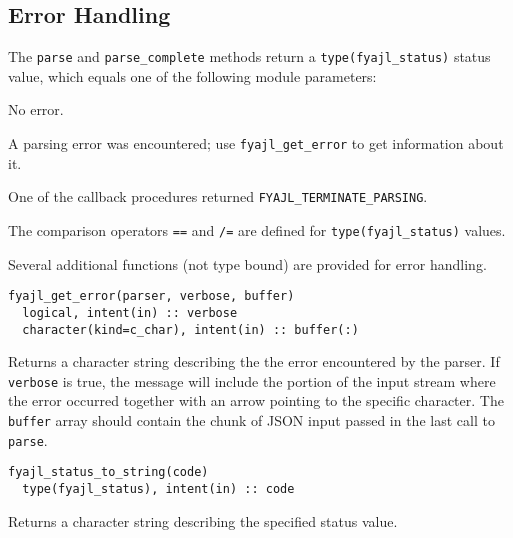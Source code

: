 \documentclass[11pt]{article}
\begin{document}
\subsection{Error Handling}
The \texttt{parse} and \texttt{parse_complete} methods return a
\texttt{type(fyajl_status)} status value, which equals one of the
following module parameters:
\begin{description}[style=nextline]\setlength{\itemsep}{0pt}
\item[FYAJL_STATUS_OK]
  No error.
\item[FYAJL_STATUS_ERROR]
  A parsing error was encountered;
  use \texttt{fyajl_get_error} to get information about it.
\item[FYAJL_STATUS_CLIENT_CANCELLED]
  One of the callback procedures returned \texttt{FYAJL_TERMINATE_PARSING}.
\end{description}
The comparison operators \texttt{==} and \texttt{/=} are defined for
\texttt{type(fyajl_status)} values.

Several additional functions (not type bound) are provided for error handling.
\begin{verbatim}
fyajl_get_error(parser, verbose, buffer)
  logical, intent(in) :: verbose
  character(kind=c_char), intent(in) :: buffer(:)
\end{verbatim}
Returns a character string describing the the error encountered by the parser.
If \texttt{verbose} is true, the message will include the portion of the input
stream where the error occurred together with an arrow pointing to the specific
character.  The \texttt{buffer} array should contain the chunk of JSON input
passed in the last call to \texttt{parse}. 
\begin{verbatim}
fyajl_status_to_string(code)
  type(fyajl_status), intent(in) :: code
\end{verbatim}
Returns a character string describing the specified status value.
\end{document}
